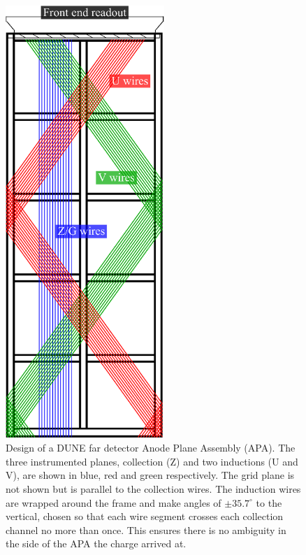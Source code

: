 \begin{figure}
  \centering
  \includegraphics[width=6cm]{FarDetectorAPA.eps}
  \caption[Design of a DUNE far detector Anode Plane Assembly (APA).]{Design of a DUNE far detector Anode Plane Assembly (APA).  The three instrumented planes, collection (Z) and two inductions (U and V), are shown in blue, red and green respectively.  The grid plane is not shown but is parallel to the collection wires.  The induction wires are wrapped around the frame and make angles of $\pm35.7^{\circ}$ to the vertical, chosen so that each wire segment crosses each collection channel no more than once.  This ensures there is no ambiguity in the side of the APA the charge arrived at.}
  \label{fig:DUNEFarDetectorAPA}
\end{figure}

